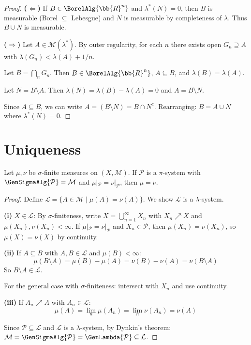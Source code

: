 \begin{proof}
\textbf{($\Leftarrow$)} If $B \in \BorelAlg{\bb{R}^n}$ and $\lambda^*(N) = 0$, then $B$ is measurable (Borel $\subseteq$ Lebesgue) and $N$ is measurable by completeness of $\lambda$. Thus $B \cup N$ is measurable.

\textbf{($\Rightarrow$)} Let $A \in \mathcal{M}(\lambda^*)$. By outer regularity, for each $n$ there exists open $G_n \supseteq A$ with $\lambda(G_n) < \lambda(A) + 1/n$.

Let $B = \bigcap_n G_n$. Then $B \in \BorelAlg{\bb{R}^n}$, $A \subseteq B$, and $\lambda(B) = \lambda(A)$.

Let $N = B \setminus A$. Then $\lambda(N) = \lambda(B) - \lambda(A) = 0$ and $A = B \setminus N$.

Since $A \subseteq B$, we can write $A = (B \setminus N) = B \cap N^c$. Rearranging: $B = A \cup N$ where $\lambda^*(N) = 0$.
\end{proof}

\section{Uniqueness}

\begin{theorem}
Let $\mu, \nu$ be $\sigma$-finite measures on $(X, \mathcal{M})$. If $\mathcal{P}$ is a $\pi$-system with $\GenSigmaAlg{\mathcal{P}} = \mathcal{M}$ and $\mu|_{\mathcal{P}} = \nu|_{\mathcal{P}}$, then $\mu = \nu$.
\end{theorem}

\begin{proof}
Define $\mathcal{L} = \{A \in \mathcal{M} \mid \mu(A) = \nu(A)\}$. We show $\mathcal{L}$ is a $\lambda$-system.

\textbf{(i)} $X \in \mathcal{L}$: By $\sigma$-finiteness, write $X = \bigcup_{n=1}^\infty X_n$ with $X_n \nearrow X$ and $\mu(X_n), \nu(X_n) < \infty$. If $\mu|_{\mathcal{P}} = \nu|_{\mathcal{P}}$ and $X_n \in \mathcal{P}$, then $\mu(X_n) = \nu(X_n)$, so $\mu(X) = \nu(X)$ by continuity.

\textbf{(ii)} If $A \subseteq B$ with $A, B \in \mathcal{L}$ and $\mu(B) < \infty$:
\[ \mu(B \setminus A) = \mu(B) - \mu(A) = \nu(B) - \nu(A) = \nu(B \setminus A) \]
So $B \setminus A \in \mathcal{L}$.

For the general case with $\sigma$-finiteness: intersect with $X_n$ and use continuity.

\textbf{(iii)} If $A_n \nearrow A$ with $A_n \in \mathcal{L}$:
\[ \mu(A) = \lim_n \mu(A_n) = \lim_n \nu(A_n) = \nu(A) \]

Since $\mathcal{P} \subseteq \mathcal{L}$ and $\mathcal{L}$ is a $\lambda$-system, by Dynkin's theorem: $\mathcal{M} = \GenSigmaAlg{\mathcal{P}} = \GenLambda{\mathcal{P}} \subseteq \mathcal{L}$.
\end{proof}


